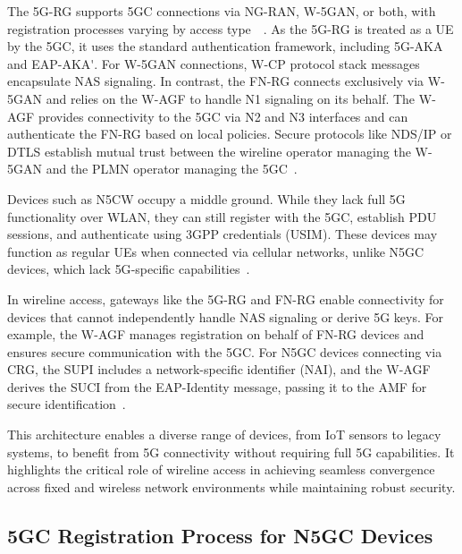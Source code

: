 The \ac{5G-RG} supports \ac{5GC} connections via \ac{NG-RAN}, \ac{W-5GAN}, or both, with registration processes varying by access type~\cite{23.316-p29}~\cite{23.316-p37}. As the \ac{5G-RG} is treated as a \ac{UE} by the \ac{5GC}, it uses the standard authentication framework, including \ac{5G-AKA} and \ac{EAP-AKA'}. For \ac{W-5GAN} connections, \ac{W-CP} protocol stack messages encapsulate \ac{NAS} signaling. In contrast, the \ac{FN-RG} connects exclusively via \ac{W-5GAN} and relies on the \ac{W-AGF} to handle N1 signaling on its behalf. The \ac{W-AGF} provides connectivity to the \ac{5GC} via N2 and N3 interfaces and can authenticate the \ac{FN-RG} based on local policies. Secure protocols like \ac{NDS/IP} or \ac{DTLS} establish mutual trust between the wireline operator managing the \ac{W-5GAN} and the \ac{PLMN} operator managing the \ac{5GC}~\cite{23.316-p41}.

Devices such as \ac{N5CW} occupy a middle ground. While they lack full \ac{5G} functionality over \ac{WLAN}, they can still register with the \ac{5GC}, establish \ac{PDU} sessions, and authenticate using \ac{3GPP} credentials (\ac{USIM}). These devices may function as regular \acp{UE} when connected via cellular networks, unlike \ac{N5GC} devices, which lack \ac{5G}-specific capabilities~\cite{33.501-p279}.

In wireline access, gateways like the \ac{5G-RG} and \ac{FN-RG} enable connectivity for devices that cannot independently handle \ac{NAS} signaling or derive \ac{5G} keys. For example, the \ac{W-AGF} manages registration on behalf of \ac{FN-RG} devices and ensures secure communication with the \ac{5GC}. For \ac{N5GC} devices connecting via \ac{CRG}, the \ac{SUPI} includes a network-specific identifier (\ac{NAI}), and the \ac{W-AGF} derives the \ac{SUCI} from the \ac{EAP}-Identity message, passing it to the \ac{AMF} for secure identification~\cite{23.316-p23}.

This architecture enables a diverse range of devices, from \ac{IoT} sensors to legacy systems, to benefit from \ac{5G} connectivity without requiring full \ac{5G} capabilities. It highlights the critical role of wireline access in achieving seamless convergence across fixed and wireless network environments while maintaining robust security.

\subsection{\acs{5GC} Registration Process for \acs{N5GC} Devices}

